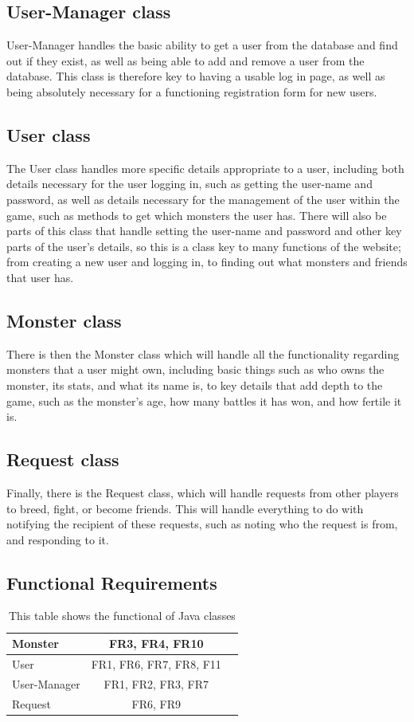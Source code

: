 \documentclass{project}
\begin{document}
\subsection{User-Manager class}
User-Manager handles the basic ability to get a user from the database and find out if they exist, as well as being able to add and remove a user from the database. This class is therefore key to having a usable log in page, as well as being absolutely necessary for a functioning registration form for new users.
\subsection{User class}
The User class handles more specific details appropriate to a user, including both details necessary for the user logging in, such as getting the user-name and password, as well as details necessary for the management of the user within the game, such as methods to get which monsters the user has. There will also be parts of this class that handle setting the user-name and password and other key parts of the user’s details, so this is a class key to many functions of the website; from creating a new user and logging in, to finding out what monsters and friends that user has.
\subsection{Monster class}
There is then the Monster class which will handle all the functionality regarding monsters that a user might own, including basic things such as who owns the monster, its stats, and what its name is, to key details that add depth to the game, such as the monster’s age, how many battles it has won, and how fertile it is.
\subsection{Request class}
Finally, there is the Request class, which will handle requests from other players to breed, fight, or become friends. This will handle everything to do with notifying the recipient of these requests, such as noting who the request is from, and responding to it.

\subsection{Functional Requirements}
\begin{table}[!h]
\centering
\begin{tabular}{|l|c|r}
\hline
Monster & FR3, FR4, FR10 \\ \hline
User & FR1, FR6, FR7, FR8, F11 \\ \hline
User-Manager & FR1, FR2, FR3, FR7 \\ \hline
Request & FR6, FR9 \\ \hline
\end{tabular}
\caption{This table shows the functional of Java classes}
\label{tab:myfirsttable}
\end{table} 
\end{document}
